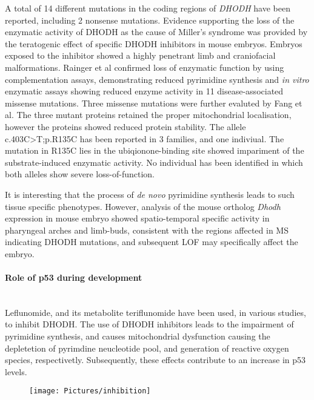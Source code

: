 \documentclass[12pt]{article}
\begin{document}
A total of 14 different mutations in the coding regions of \textit{DHODH} have been reported, including 2 nonsense mutations. Evidence supporting the loss of the enzymatic activity of DHODH as the cause of Miller's syndrome was provided by the teratogenic effect of specific DHODH inhibitors in mouse embryos. Embryos exposed to the inhibitor showed a highly penetrant limb and craniofacial malformations. Rainger et al confirmed loss of enzymatic function by using complementation assays, demonstrating reduced pyrimidine synthesis and \textit{in vitro} enzymatic assays showing reduced enzyme activity in 11 disease-associated missense mutations. Three missense mutations were further evaluted by Fang et al. The three mutant proteins retained the proper mitochondrial localisation, however the proteins showed reduced protein stability. The allele c.403C>T;p.R135C has been reported in 3 families, and one indiviual. The mutation in R135C lies in the ubiqionone-binding site showed impariment of the substrate-induced enzymatic activity. No individual has been identified in which both alleles show severe loss-of-function.  

It is interesting that the process of \textit{de novo} pyrimidine synthesis leads to such tissue specific phenotypes. However, analysis of the mouse ortholog \textit{Dhodh} expression in mouse embryo showed spatio-temporal specific activity in pharyngeal arches and limb-buds, consistent with the regions affected in MS indicating DHODH mutations, and subsequent LOF may specifically affect the embryo.

\paragraph{Role of p53 during development}
~\\ Leflunomide, and its metabolite teriflunomide have been used, in various studies, to inhibit DHODH. The use of DHODH inhibitors leads to the impairment of pyrimidine synthesis, and causes mitochondrial dysfunction causing the depletetion of pyrimdine neucleotide pool, and generation of reactive oxygen species, respectivetly. Subsequently, these effects contribute to an increase in p53 levels.

\begin{figure}[!htp]
	\centering
	\texttt{[image: Pictures/inhibition]}
	\caption{}
	\label{fig:inhibition}
\end{figure}
\end{document}
